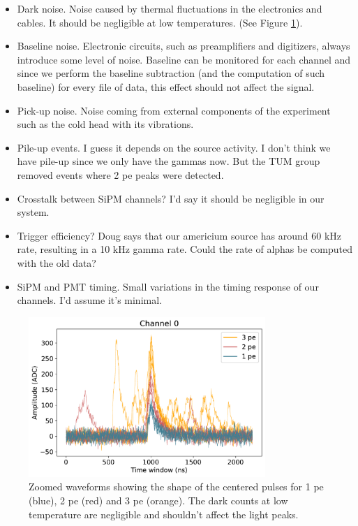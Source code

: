 \documentclass[11pt,a4paper,english,oneside, pdf]{article}
\begin{document}
	\begin{itemize}
		\item Dark noise. Noise caused by thermal fluctuations in the electronics and cables. It should be negligible at low temperatures. (See Figure \ref{fig:single_pe_shape}).
		
		\item Baseline noise. Electronic circuits, such as preamplifiers and digitizers, always introduce some level of noise. Baseline can be monitored for each channel and since we perform the baseline subtraction (and the computation of such baseline) for every file of data, this effect should not affect the signal.
		
		\item Pick-up noise. Noise coming from external components of the experiment such as the cold head with its vibrations.
		
		\item Pile-up events. I guess it depends on the source activity. I don't think we have pile-up since we only have the gammas now. But the TUM group removed events where 2 pe peaks were detected.
		
		\item Crosstalk between SiPM channels? I'd say it should be negligible in our system.
		
		\item Trigger efficiency? Doug says that our americium source has around 60 kHz rate, resulting in a 10 kHz gamma rate. Could the rate of alphas be computed with the old data?
		
		\item SiPM and PMT timing. Small variations in the timing response of our channels. I'd assume it's minimal.
	\end{itemize}
	
		\begin{figure}[t]
		\begin{center}
			\includegraphics[width=0.8\textwidth]{images/single_pe_shape.pdf}
			\caption{Zoomed waveforms showing the shape of the centered pulses for 1 pe (blue), 2 pe (red) and 3 pe (orange). The dark counts at low temperature are negligible and shouldn't affect the light peaks.}
			\label{fig:single_pe_shape}
		\end{center}
	\end{figure}
	
	
\end{document}
